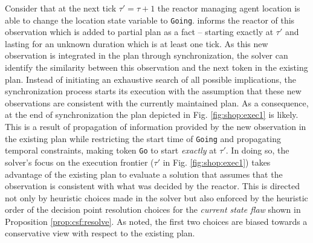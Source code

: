 Consider that at the next tick $\tau' = \tau+1$ the reactor managing
agent location is able to change the location state variable to
\texttt{Going}. \rx informs the reactor  of this observation which is added to
 partial plan as a fact -- starting exactly at $\tau'$
and lasting for an unknown duration which is at least one tick. As
this new observation is integrated in the plan through
synchronization, the solver can identify the similarity between this
observation and the next token in the existing plan. Instead of
initiating an exhaustive search of all possible implications, the
synchronization process starts its execution with the assumption that
these new observations are consistent with the currently maintained
plan. As a consequence, at the end of synchronization the plan
depicted in Fig.  \ref{fig:shop:exec1} is likely. This is a result of
propagation of information provided by the new observation in the
existing plan while restricting the start time of \texttt{Going} and
propagating temporal constraints, making token \texttt{Go} to start
{\em exactly} at $\tau'$. In doing so, the \eu solver's focus on the
execution frontier ($\tau'$ in Fig. \ref{fig:shop:exec1}) takes
advantage of the existing plan to evaluate a solution that assumes
that the observation is consistent with what was decided by the
reactor.  This is directed not only by heuristic choices made in
the solver but also enforced by the heuristic order of the decision
point resolution choices for the {\em current state flaw}
 shown in Proposition \ref{prop:csf:resolve}. As noted,
the first two choices are biased towards a conservative view with
respect to the existing plan.

\label{sec:arch:partialfailures}

